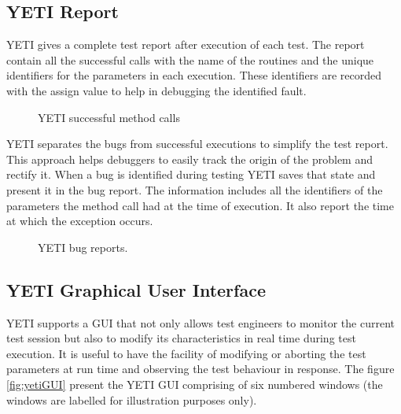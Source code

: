 \subsection{YETI Report}
YETI gives a complete test report after execution of each test. The report contain all the successful calls with the name of the routines and the unique identifiers for the parameters in each execution. These identifiers are recorded with the assign value to help in debugging the identified fault. 
\begin{figure}[h]
	\centering
	\caption{YETI successful method calls}
\end{figure}

YETI separates the bugs from successful executions to simplify the test report. This approach helps debuggers to easily track the origin of the problem and rectify it. When a bug is identified during testing YETI saves that state and present it in the bug report. The information includes all the identifiers of the parameters the method call had at the time of execution. It also report the time at which the exception occurs.

\begin{figure}[h]
	\centering
	\caption{YETI bug reports.}
\end{figure}

\subsection{YETI Graphical User Interface}
YETI supports a GUI that not only allows test engineers to monitor the current test session but also to modify its characteristics in real time during test execution. It is useful to have the facility of modifying or aborting the test parameters at run time and observing the test behaviour in response. The figure \ref{fig:yetiGUI} present the YETI GUI comprising of six numbered windows (the windows are labelled for illustration purposes only).

